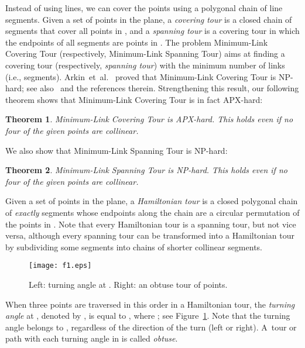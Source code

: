 \documentclass[letterpaper,11pt]{article}
\newtheorem{theorem}{Theorem}
\def\etal{{et~al.}}
\def\ie{{i.e.}}
\begin{document}
Instead of using lines,
we can cover the points using a polygonal chain of line segments.
Given a set  of  points in the plane,
a \emph{covering tour} is a closed chain of segments
that cover all  points in ,
and a \emph{spanning tour} is a covering tour in which
the endpoints of all segments are points in .
The problem {\sc Minimum-Link Covering Tour}
(respectively,
{\sc Minimum-Link Spanning Tour})
aims at finding a covering tour
(respectively,
\emph{spanning tour})
with the minimum number of links (\ie, segments).
Arkin~\etal~\cite{AMP03} proved that {\sc Minimum-Link Covering Tour}
is NP-hard; see also~\cite{ABDFMS05,Ji12} and the references therein.
Strengthening this result, our following theorem shows that
{\sc Minimum-Link Covering Tour} is in fact APX-hard:

\begin{theorem}\label{thm:covering}
{\sc Minimum-Link Covering Tour} is APX-hard.
This holds even if no four of the given points are collinear.
\end{theorem}

We also show that {\sc Minimum-Link Spanning Tour} is NP-hard:

\begin{theorem}\label{thm:spanning}
{\sc Minimum-Link Spanning Tour} is NP-hard.
This holds even if no four of the given points are collinear.
\end{theorem}

Given a set  of  points in the plane,
a \emph{Hamiltonian tour} is a closed polygonal chain of
\emph{exactly}  segments whose  endpoints along the chain are
a circular permutation of the  points in .
Note that every Hamiltonian tour is a spanning tour, but not vice versa,
although every spanning tour can be transformed into a Hamiltonian tour
by subdividing some segments into chains of shorter collinear segments.
\begin{figure}[htb]
\centering\texttt{[image: f1.eps]}
\caption{Left: turning angle at .
Right: an obtuse tour of  points.}
\label{fig:f1}
\end{figure}

When three points  are traversed in this order in a
Hamiltonian tour, 
the \emph{turning angle} at , denoted by ,
is equal to , where ;
see Figure~\ref{fig:f1}. Note that the turning angle belongs to , 
regardless of the direction of the turn (left or right). 
A~tour or path with each turning angle in  is called \emph{obtuse}.
\end{document}
